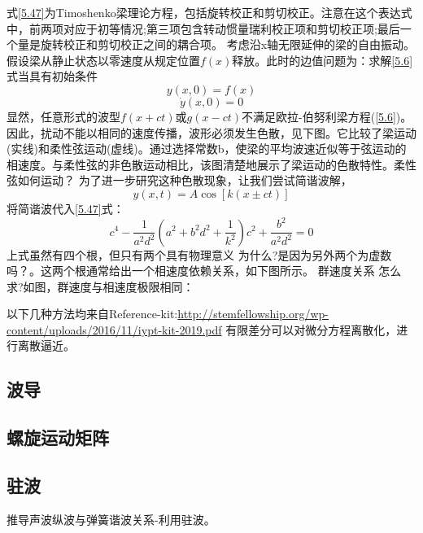 \documentclass[UTF8,9pt]{report}
\begin{document}
式\ref{5.47}为Timoshenko梁理论方程，包括旋转校正和剪切校正。注意在这个表达式中，前两项对应于初等情况;第三项包含转动惯量瑞利校正项和剪切校正项;最后一个量是旋转校正和剪切校正之间的耦合项。
考虑沿x轴无限延伸的梁的自由振动。假设梁从静止状态以零速度从规定位置$f(x)$释放。此时的边值问题为：求解\ref{5.6}式当具有初始条件
$$y(x,0)=f(x)$$
$$\dot{y}(x,0)=0$$
显然，任意形式的波型$f(x + ct)$或$g(x - ct)$不满足欧拉-伯努利梁方程(\ref{5.6})。因此，扰动不能以相同的速度传播，波形必须发生色散，见下图。它比较了梁运动(实线)和柔性弦运动(虚线)。通过选择常数b，使梁的平均波速近似等于弦运动的相速度。与柔性弦的非色散运动相比，该图清楚地展示了梁运动的色散特性。{\color{red}柔性弦如何运动？}
为了进一步研究这种色散现象，让我们尝试简谐波解，
$$y(x,t)=A\cos[k(x \pm ct)]$$
将简谐波代入\ref{5.47}式：
$$c ^ { 4 } - \frac { 1 } { a ^ { 2 } d ^ { 2 } } ( a ^ { 2 } + b ^ { 2 } d ^ { 2 } + \frac { 1 } { k ^ { 2 } }) c ^ { 2 } + \frac { b ^ { 2 } } { a ^ { 2 } d ^ { 2 } } = 0$$
上式虽然有四个根，但只有两个具有物理意义{\color{red} 为什么?是因为另外两个为虚数吗？}。这两个根通常给出一个相速度依赖关系，如下图所示。
群速度关系{\color{red} 怎么求?}如图，群速度与相速度极限相同：

以下几种方法均来自Reference-kit:\url{http://stemfellowship.org/wp-content/uploads/2016/11/iypt-kit-2019.pdf}
有限差分可以对微分方程离散化，进行离散逼近。
\subsection*{波导}
\subsection*{螺旋运动矩阵}
\subsection*{驻波}
推导声波纵波与弹簧谐波关系-利用驻波。
\end{document}
